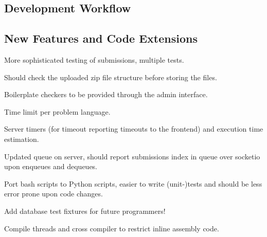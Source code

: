 \subsection*{Development Workflow}


\subsection*{New Features and Code Extensions}
More sophisticated testing of submissions, multiple tests.

Should check the uploaded zip file structure before storing the files.

Boilerplate checkers to be provided through the admin interface.

Time limit per problem language.

Server timers (for timeout reporting timeouts to the frontend) and execution time estimation.

Updated queue on server, should report submissions index in queue over socketio upon enqueues and dequeues.

Port bash scripts to Python scripts, easier to write (unit-)tests and should be less error prone upon code changes.

Add database test fixtures for future programmers!

Compile threads and cross compiler to restrict inline assembly code.
